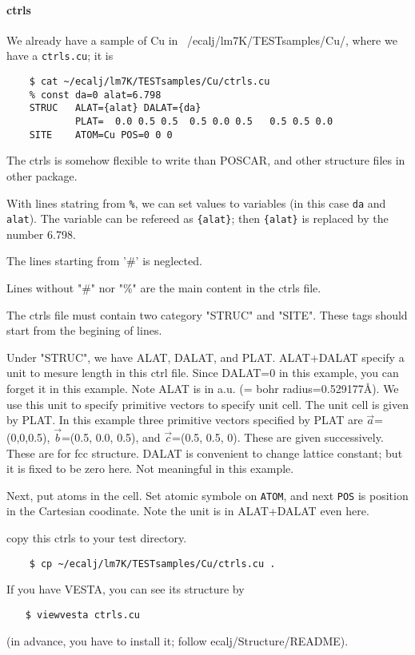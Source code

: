 \documentclass[a4paper,10pt,epsf,fleqn]{article}
\begin{document}
\paragraph{ctrls}
We already have a sample of Cu in ~/ecalj/lm7K/TESTsamples/Cu/,
where we have a \verb+ctrls.cu+; it is
\begin{verbatim}
    $ cat ~/ecalj/lm7K/TESTsamples/Cu/ctrls.cu
    % const da=0 alat=6.798
    STRUC   ALAT={alat} DALAT={da}
            PLAT=  0.0 0.5 0.5  0.5 0.0 0.5   0.5 0.5 0.0
    SITE    ATOM=Cu POS=0 0 0
\end{verbatim}
The ctrls is somehow flexible to write than POSCAR, and other structure files
in other package.

With lines statring from \verb+%+, we can set values to variables
(in this case \verb+da+ and \verb+alat+). 
The variable can be refereed as \verb+{alat}+; then \verb+{alat}+ is
replaced by the number 6.798.

The lines starting from '\#' is neglected.

Lines without "\#" nor "\%" are the main content in the ctrls file.

The ctrls file must contain two category "STRUC" and "SITE". 
These tags should start from the begining of lines.

Under "STRUC", we have ALAT, DALAT, and PLAT.
ALAT+DALAT specify a unit to mesure length in this ctrl file.
Since DALAT=0 in this example, you can forget it in this example.
Note ALAT is in a.u. (= bohr radius=0.529177\AA). We use this unit
to specify primitive vectors to specify unit cell.
The unit cell is given by PLAT.
In this example three primitive vectors specified by PLAT are
$\vec{a}$=(0,0,0.5), $\vec{b}$=(0.5, 0.0, 0.5), and $\vec{c}$=(0.5, 0.5, 0). 
These are given successively. These are for fcc structure.
DALAT is convenient to change lattice constant; but it is fixed to be
zero here. Not meaningful in this example.

Next, put atoms in the cell.
Set atomic symbole on \verb+ATOM+, and next \verb+POS+
is position in the Cartesian coodinate.
Note the unit is in ALAT+DALAT even here.

copy this ctrls to your test directory.
\begin{verbatim}
    $ cp ~/ecalj/lm7K/TESTsamples/Cu/ctrls.cu .
\end{verbatim}

If you have VESTA, you can see its structure by 
\begin{verbatim}
　　$ viewvesta ctrls.cu
\end{verbatim}
(in advance, you have to install it; follow ecalj/Structure/README).
\end{document}
